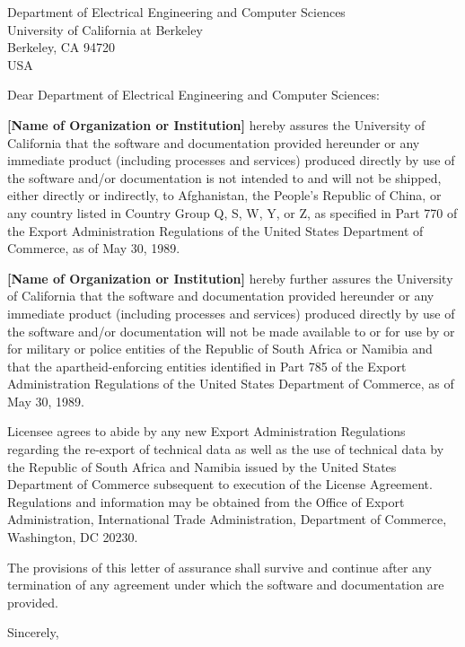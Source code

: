 \renewcommand{\today}{Date}
\signature{Signed by member of your organization}
\address{Address of your organization}


\begin{letter}{Department of Electrical Engineering and Computer Sciences\\University of California at Berkeley\\Berkeley, CA   94720\\USA}

\opening{Dear Department of Electrical Engineering and Computer Sciences:}

{\bf [Name of Organization or Institution]} hereby assures the
University of California that the software and documentation provided
hereunder or any immediate product (including processes and services)
produced directly by use of the software and/or documentation is not
intended to and will not be shipped, either directly or indirectly, to
Afghanistan, the People's Republic of China, or any country listed in
Country Group Q, S, W, Y, or Z, as specified in Part 770 of the Export
Administration Regulations of the United States Department of
Commerce, as of May 30, 1989.

{\bf [Name of Organization or Institution]} hereby further assures the
University of California that the software and documentation provided
hereunder or any immediate product (including processes and services)
produced directly by use of the software and/or documentation will not
be made available to or for use by or for military or police entities
of the Republic of South Africa or Namibia and that the
apartheid-enforcing entities identified in Part 785 of the Export
Administration Regulations of the United States Department of
Commerce, as of May 30, 1989.

Licensee agrees to abide by any new Export Administration Regulations
regarding the re-export of technical data as well as the use of
technical data by the Republic of South Africa and Namibia issued by
the United States Department of Commerce subsequent to execution of
the License Agreement.  Regulations and information may be obtained
from the Office of Export Administration, International Trade
Administration, Department of Commerce, Washington, DC  20230.

The provisions of this letter of assurance shall survive and continue
after any termination of any agreement under which the software and
documentation are provided.

\closing{Sincerely,\linebreak\vspace*{6ex}}

\end{letter}

